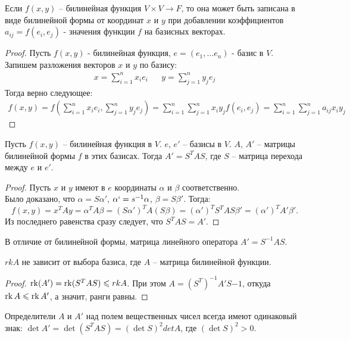 \begin{proposition}
    \label{pr8.1}
    Если $f(x, y)$ -- билинейная функция $V \times V \to F$, то она может быть записана в виде билинейной формы от координат $x$ и $y$ при добавлении коэффициентов $a_{ij} = f(e_i, e_j)$ - значения функции $f$ на базисных векторах. 
\end{proposition}

\begin{proof}
    Пусть $f(x, y)$ - билинейная функция, $e = (e_1, \dots e_n)$ - базис в $V$. Запишем разложения векторов $x$ и $y$ по базису:
    \begin{align*}
        x = \sum_{i=1}^{n} x_i e_i && y = \sum_{j=1}^{n} y_j e_j
    \end{align*}
    Тогда верно следующее:
    \begin{gather*}
        f(x, y) = f(\sum_{i=1}^{n} x_i e_i, \sum_{j=1}^{n} y_j e_j) = \sum_{i=1}^{n} \sum_{j=1}^{n} x_i y_j f(e_i, e_j) = \sum_{i=1}^{n} \sum_{j=1}^{n} a_{ij} x_i y_j
    \end{gather*}
\end{proof}

\begin{proposition}
    \label{pr8.2}
    Пусть $f(x, y)$ -- билинейная функция в $V$. $e$, $e'$ -- базисы в $V$. $A$, $A'$ -- 
    матрицы билинейной формы $f$ в этих базисах. Тогда $A' = S^T A S$, где $S$ -- матрица перехода 
    между $e$ и $e'$. 
\end{proposition}

\begin{proof}
    Пусть $x$ и $y$ имеют в $e$ координаты $\alpha$ и $\beta$ соответственно.\\ Было доказано, что $\alpha = S \alpha'$, $\alpha` = s^{-1} \alpha$, $\beta = S \beta'$. Тогда:
    $$f(x, y) = x^T A y = \alpha^T A \beta = (S \alpha')^T A (S \beta) = (\alpha')^T S^T A S \beta' = (\alpha')^T A' \beta'.$$ Из последнего равенства сразу следует, что $S^T A S = A'$.
\end{proof}

\begin{note}
    В отличие от билинейной формы, матрица линейного оператора $A' = S^{-1} A S$.
\end{note}

\begin{proposition}
    $rk A$ не зависит от выбора базиса, где $A$ -- матрица билинейной функции.
\end{proposition}

\begin{proof}
        $\operatorname{rk} (A') = \operatorname{rk} (S^T A S) \leqslant rk A$. При этом $A = (S^T)^{-1} A' S{-1}$, откуда $\operatorname{rk} A \leqslant \operatorname{rk} A'$, а значит, ранги равны.
\end{proof}

\begin{corollary}
    Определители $A$ и $A'$ над полем вещественных чисел всегда имеют одинаковый знак: $\det A' = \det(S^T A S) = (\det S)^2 det A$, где $(\det S)^2 > 0$.
\end{corollary}
